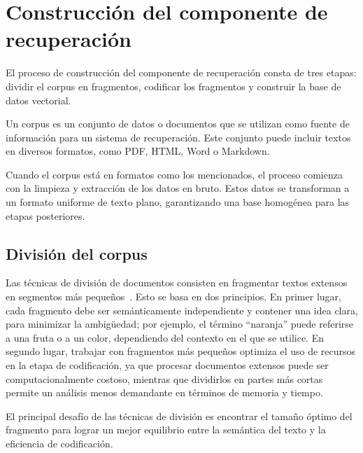 \section{Construcción del componente de recuperación}

El proceso de construcción del componente de recuperación consta de tres etapas: dividir el corpus en fragmentos, codificar los fragmentos y construir la base de datos vectorial.

Un corpus es un conjunto de datos o documentos que se utilizan como fuente de información para un sistema de recuperación. Este conjunto puede incluir textos en diversos formatos, como PDF, HTML, Word o Markdown.

Cuando el corpus está en formatos como los mencionados, el proceso comienza con la limpieza y extracción de los datos en bruto. Estos datos se transforman a un formato uniforme de texto plano, garantizando una base homogénea para las etapas posteriores.

\subsection{División del corpus}

Las técnicas de división de documentos consisten en fragmentar textos extensos en segmentos más pequeños~\cite{gong2020recurrentchunkingmechanismslongtext}. Esto se basa en dos principios. En primer lugar, cada fragmento debe ser semánticamente independiente y contener una idea clara, para minimizar la ambigüedad; por ejemplo, el término ``naranja'' puede referirse a una fruta o a un color, dependiendo del contexto en el que se utilice. En segundo lugar, trabajar con fragmentos más pequeños optimiza el uso de recursos en la etapa de codificación, ya que procesar documentos extensos puede ser computacionalmente costoso, mientras que dividirlos en partes más cortas permite un análisis menos demandante en términos de memoria y tiempo.

El principal desafío de las técnicas de división es encontrar el tamaño óptimo del fragmento para lograr un mejor equilibrio entre la semántica del texto y la eficiencia de codificación.

